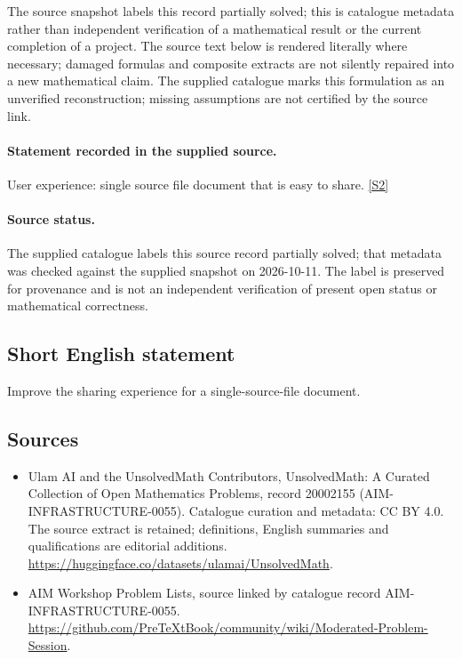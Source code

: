 \documentclass[11pt]{article}
\begin{document}
The source snapshot labels this record partially solved; this is catalogue metadata rather than independent verification of a mathematical result or the current completion of a project.
The source text below is rendered literally where necessary; damaged formulas and composite extracts are not silently repaired into a new mathematical claim.
The supplied catalogue marks this formulation as an unverified reconstruction; missing assumptions are not certified by the source link.
\paragraph{Statement recorded in the supplied source.}
User experience: single source file document that is easy to share. \href{https://github.com/PreTeXtBook/community/wiki/Moderated-Problem-Session}{[S2]}
\paragraph{Source status.}
The supplied catalogue labels this source record partially solved; that metadata was checked against the supplied snapshot on 2026-10-11. The label is preserved for provenance and is not an independent verification of present open status or mathematical correctness.
\subsection{Short English statement}
Improve the sharing experience for a single-source-file document.
\subsection{Sources}
\begin{itemize}
\item[S1] Ulam AI and the UnsolvedMath Contributors, UnsolvedMath: A Curated Collection of Open Mathematics Problems, record 20002155 (AIM-INFRASTRUCTURE-0055). Catalogue curation and metadata: CC BY 4.0. The source extract is retained; definitions, English summaries and qualifications are editorial additions.
\url{https://huggingface.co/datasets/ulamai/UnsolvedMath}.
\item[S2] AIM Workshop Problem Lists, source linked by catalogue record AIM-INFRASTRUCTURE-0055.
\url{https://github.com/PreTeXtBook/community/wiki/Moderated-Problem-Session}.
\end{itemize}
\end{document}
